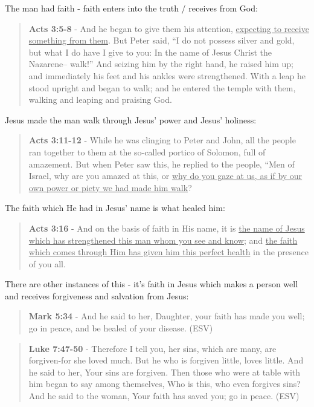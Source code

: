 \documentclass[11pt]{article}
\begin{document}
The man had faith - faith enters into the truth / receives from God:

\begin{quote}
\textbf{Acts 3:5-8} - And he began to give them his attention, \uline{expecting to receive something from them}. But Peter said, “I do not possess silver and gold, but what I do have I give to you: In the name of Jesus Christ the Nazarene-- walk!” And seizing him by the right hand, he raised him up; and immediately his feet and his ankles were strengthened. With a leap he stood upright and began to walk; and he entered the temple with them, walking and leaping and praising God.
\end{quote}

Jesus made the man walk through Jesus' power and Jesus' holiness:

\begin{quote}
\textbf{Acts 3:11-12} - While he was clinging to Peter and John, all the people ran together to them at the so-called portico of Solomon, full of amazement. But when Peter saw this, he replied to the people, “Men of Israel, why are you amazed at this, or \uline{why do you gaze at us, as if by our own power or piety we had made him walk}?
\end{quote}

The faith which He had in Jesus' name is what healed him:

\begin{quote}
\textbf{Acts 3:16} - And on the basis of faith in His name, it is \uline{the name of Jesus which has strengthened this man whom you see and know}; and \uline{the faith which comes through Him has given him this perfect health} in the presence of you all.
\end{quote}

There are other instances of this - it's faith in Jesus which makes a person well and receives forgiveness and salvation from Jesus:

\begin{quote}
\textbf{Mark 5:34} -  And he said to her, Daughter, your faith has made you well; go in peace, and be healed of your disease.  (ESV)
\end{quote}

\begin{quote}
\textbf{Luke 7:47-50} - Therefore I tell you, her sins, which are many, are forgiven-for she loved much. But he who is forgiven little, loves little. And he said to her, Your sins are forgiven. Then those who were at table with him began to say among themselves, Who is this, who even forgives sins? And he said to the woman, Your faith has saved you; go in peace. (ESV)
\end{quote}
\end{document}
